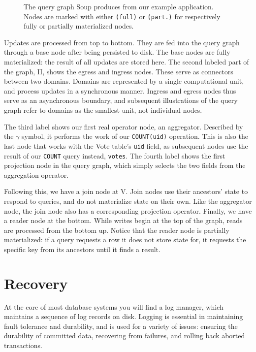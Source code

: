 \documentclass[b5paper]{report}
\begin{document}
\begin{figure}[H]
  \centering
  
  \caption{
    The query graph Soup produces from our example application. Nodes are marked
    with either \texttt{(full)} or \texttt{(part.)} for respectively fully or
    partially materialized nodes.
    \label{fig:example-graph}
  }
\end{figure}

Updates are processed from top to bottom. They are fed into the query graph
through a base node after being persisted to disk. The base nodes are fully
materialized: the result of all updates are stored here. The second labeled part
of the graph, II, shows the egress and ingress nodes. These serve as connectors
between two domains. Domains are represented by a single computational unit, and
process updates in a synchronous manner. Ingress and egress nodes thus serve as
an asynchronous boundary, and subsequent illustrations of the query graph refer
to domains as the smallest unit, not individual nodes.

The third label shows our first real operator node, an aggregator. Described by
the $ \gamma $ symbol, it performs the work of our \texttt{COUNT(uid)} operation. This is
also the last node that works with the Vote table's \texttt{uid} field, as
subsequent nodes use the result of our \texttt{COUNT} query instead,
\texttt{votes}. The fourth label shows the first projection node in the query
graph, which simply selects the two fields from the aggregation operator.

Following this, we have a join node at V. Join nodes use their ancestors' state
to respond to queries, and do not materialize state on their own. Like the
aggregator node, the join node also has a corresponding projection operator.
Finally, we have a reader node at the bottom. While writes begin at the top of
the graph, reads are processed from the bottom up. Notice that the reader node
is partially materialized: if a query requests a row it does not store state
for, it requests the specific key from its ancestors until it finds a result.

\section{Recovery} \label{aries}
At the core of most database systems you will find a log manager, which
maintains a sequence of log records on disk. Logging is essential in maintaining
fault tolerance and durability, and is used for a variety of issues: ensuring
the durability of committed data, recovering from failures, and rolling back
aborted transactions.
\end{document}

